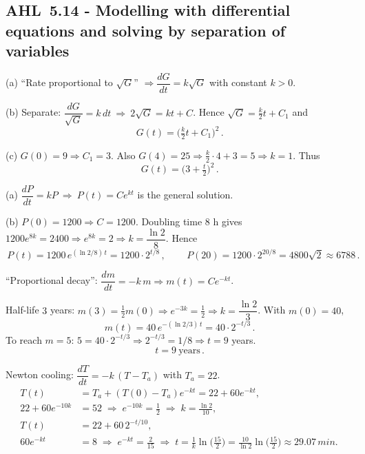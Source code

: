 \documentclass[11pt]{article}
\def\textbf#1{#1}%
\def\mathrm#1{#1}%
\newcommand{\tocsubsection}[1]{\subsection{#1}}
\begin{document}
\tocsubsection{AHL 5.14 - Modelling with differential equations and solving by separation of variables}

\begin{solution}
\textbf{(a)} “Rate proportional to $\sqrt{G}$” $\Rightarrow \dfrac{dG}{dt}=k\sqrt{G}$ with constant $k>0$.

\textbf{(b)} Separate: $\dfrac{dG}{\sqrt{G}}=k\,dt\ \Rightarrow\ 2\sqrt{G}=kt+C$.
Hence $\displaystyle \sqrt{G}=\frac{k}{2}t+C_1$ and
\[
\boxed{\,G(t)=\Big(\tfrac{k}{2}t+C_1\Big)^2\,}.
\]

\textbf{(c)} $G(0)=9\Rightarrow C_1=3$. Also $G(4)=25\Rightarrow \tfrac{k}{2}\cdot4+3=5\Rightarrow k=1$.
Thus
\[
\boxed{\,G(t)=\Big(3+\tfrac{t}{2}\Big)^2\,}.
\]
\end{solution}

\begin{solution}
\textbf{(a)} $\dfrac{dP}{dt}=kP \ \Rightarrow\ P(t)=C e^{kt}$ is the general solution.

\textbf{(b)} $P(0)=1200\Rightarrow C=1200$.  Doubling time $8$ h gives
$1200e^{8k}=2400\Rightarrow e^{8k}=2\Rightarrow k=\dfrac{\ln 2}{8}$.
Hence
\[
\boxed{\,P(t)=1200\,e^{(\ln 2/8)\,t}=1200\cdot 2^{t/8}\,},\qquad
\boxed{\,P(20)=1200\cdot 2^{20/8}=4800\sqrt{2}\approx 6788\,}.
\]
\end{solution}

\begin{solution}
“Proportional decay”: $\dfrac{dm}{dt}=-k\,m\Rightarrow m(t)=C e^{-kt}$.

Half-life $3$ years: $m(3)=\tfrac12 m(0)\Rightarrow e^{-3k}=\tfrac12\Rightarrow k=\dfrac{\ln 2}{3}$.
With $m(0)=40$,
\[
\boxed{\,m(t)=40\,e^{-(\ln 2/3)\,t}=40\cdot 2^{-t/3}\,}.
\]
To reach $m=5$:
$5=40\cdot 2^{-t/3}\Rightarrow 2^{-t/3}=1/8\Rightarrow t=9$ years.
\[
\boxed{\,t=9\ \text{years}\,}.
\]
\end{solution}

\begin{solution}
Newton cooling: $\dfrac{dT}{dt}=-k\,(T-T_a)$ with $T_a=22$.
\begin{align*}
T(t) &= T_a+(T(0)-T_a)e^{-kt}=22+60e^{-kt},\\
22+60e^{-10k} &= 52 \;\Rightarrow\; e^{-10k}=\tfrac12 \;\Rightarrow\; k=\frac{\ln 2}{10},\\
T(t) &= 22+60\,2^{-t/10},\\
60e^{-kt} &= 8 \;\Rightarrow\; e^{-kt}=\tfrac{2}{15}
\;\Rightarrow\; t=\frac{1}{k}\ln\!\Big(\tfrac{15}{2}\Big)
=\frac{10}{\ln 2}\ln\!\Big(\tfrac{15}{2}\Big)\approx 29.07\,\mathrm{min}.
\end{align*}
\end{solution}
\end{document}
